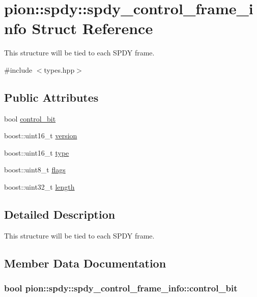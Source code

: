 \hypertarget{structpion_1_1spdy_1_1spdy__control__frame__info}{\section{pion\-:\-:spdy\-:\-:spdy\-\_\-control\-\_\-frame\-\_\-info Struct Reference}
\label{structpion_1_1spdy_1_1spdy__control__frame__info}
}


This structure will be tied to each S\-P\-D\-Y frame.  




{\ttfamily \#include $<$types.\-hpp$>$}

\subsection*{Public Attributes}
\begin{DoxyCompactItemize}
\item 
bool \hyperlink{structpion_1_1spdy_1_1spdy__control__frame__info_aab8a4df01cd7ab33225e75d3f2d6eac2}{control\-\_\-bit}
\item 
boost\-::uint16\-\_\-t \hyperlink{structpion_1_1spdy_1_1spdy__control__frame__info_a4616ceeb89c9fc021558ff10d956fa87}{version}
\item 
boost\-::uint16\-\_\-t \hyperlink{structpion_1_1spdy_1_1spdy__control__frame__info_ac5dcfbebbe23ff86c277c93f6463020c}{type}
\item 
boost\-::uint8\-\_\-t \hyperlink{structpion_1_1spdy_1_1spdy__control__frame__info_a29431bbcacc702fe6e24ad5f0c11e6b4}{flags}
\item 
boost\-::uint32\-\_\-t \hyperlink{structpion_1_1spdy_1_1spdy__control__frame__info_aae971220edc8d59da5e7b7018e2c7e6d}{length}
\end{DoxyCompactItemize}


\subsection{Detailed Description}
This structure will be tied to each S\-P\-D\-Y frame. 

\subsection{Member Data Documentation}
\hypertarget{structpion_1_1spdy_1_1spdy__control__frame__info_aab8a4df01cd7ab33225e75d3f2d6eac2}{
\subsubsection[{control\-\_\-bit}]{\setlength{\rightskip}{0pt plus 5cm}bool pion\-::spdy\-::spdy\-\_\-control\-\_\-frame\-\_\-info\-::control\-\_\-bit}}\label{structpion_1_1spdy_1_1spdy__control__frame__info_aab8a4df01cd7ab33225e75d3f2d6eac2}



